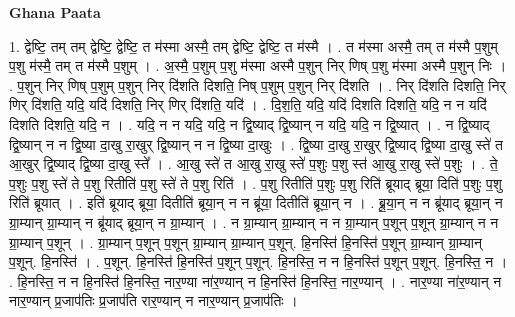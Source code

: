 \documentclass[17pt]{extarticle}
\begin{document}
\textbf{Ghana Paata } \newline

1. द्वेष्टि॒ तम् तम् द्वेष्टि॒ द्वेष्टि॒ त म॑स्मा अस्मै॒ तम् द्वेष्टि॒ द्वेष्टि॒ त म॑स्मै । . त म॑स्मा अस्मै॒ तम् त म॑स्मै प॒शुम् प॒शु म॑स्मै॒ तम् त म॑स्मै प॒शुम् । . अ॒स्मै॒ प॒शुम् प॒शु म॑स्मा अस्मै प॒शुन् निर् णिष् प॒शु म॑स्मा अस्मै प॒शुन् निः । . प॒शुन् निर् णिष् प॒शुम् प॒शुन् निर् दि॑शति दिशति॒ निष् प॒शुम् प॒शुन् निर् दि॑शति । . निर् दि॑शति दिशति॒ निर् णिर् दि॑शति॒ यदि॒ यदि॑ दिशति॒ निर् णिर् दि॑शति॒ यदि॑ । . दि॒श॒ति॒ यदि॒ यदि॑ दिशति दिशति॒ यदि॒ न न यदि॑ दिशति दिशति॒ यदि॒ न । . यदि॒ न न यदि॒ यदि॒ न द्वि॒ष्याद् द्वि॒ष्यान् न यदि॒ यदि॒ न द्वि॒ष्यात् । . न द्वि॒ष्याद् द्वि॒ष्यान् न न द्वि॒ष्या दा॒खु रा॒खुर् द्वि॒ष्यान् न न द्वि॒ष्या दा॒खुः । . द्वि॒ष्या दा॒खु रा॒खुर् द्वि॒ष्याद् द्वि॒ष्या दा॒खु स्ते॑ त आ॒खुर् द्वि॒ष्याद् द्वि॒ष्या दा॒खु स्ते᳚ । . आ॒खु स्ते॑ त आ॒खु रा॒खु स्ते॑ प॒शुः प॒शु स्त॑ आ॒खु रा॒खु स्ते॑ प॒शुः । . ते॒ प॒शुः प॒शु स्ते॑ ते प॒शु रितीति॑ प॒शु स्ते॑ ते प॒शु रिति॑ । . प॒शु रितीति॑ प॒शुः प॒शु रिति॑ ब्रूयाद् ब्रूया॒ दिति॑ प॒शुः प॒शु रिति॑ ब्रूयात् । . इति॑ ब्रूयाद् ब्रूया॒ दितीति॑ ब्रूया॒न् न न ब्रू॑या॒ दितीति॑ ब्रूया॒न् न । . ब्रू॒या॒न् न न ब्रू॑याद् ब्रूया॒न् न ग्रा॒म्यान् ग्रा॒म्यान् न ब्रू॑याद् ब्रूया॒न् न ग्रा॒म्यान् । . न ग्रा॒म्यान् ग्रा॒म्यान् न न ग्रा॒म्यान् प॒शून् प॒शून् ग्रा॒म्यान् न न ग्रा॒म्यान् प॒शून् । . ग्रा॒म्यान् प॒शून् प॒शून् ग्रा॒म्यान् ग्रा॒म्यान् प॒शून्. हि॒नस्ति॑ हि॒नस्ति॑ प॒शून् ग्रा॒म्यान् ग्रा॒म्यान् प॒शून्. हि॒नस्ति॑ । . प॒शून्. हि॒नस्ति॑ हि॒नस्ति॑ प॒शून् प॒शून्. हि॒नस्ति॒ न न हि॒नस्ति॑ प॒शून् प॒शून्. हि॒नस्ति॒ न । . हि॒नस्ति॒ न न हि॒नस्ति॑ हि॒नस्ति॒ नार॒ण्या ना॑र॒ण्यान् न हि॒नस्ति॑ हि॒नस्ति॒ नार॒ण्यान् । . नार॒ण्या ना॑र॒ण्यान् न नार॒ण्यान् प्र॒जाप॑तिः प्र॒जाप॑ति रार॒ण्यान् न नार॒ण्यान् प्र॒जाप॑तिः । \newline
\end{document}
